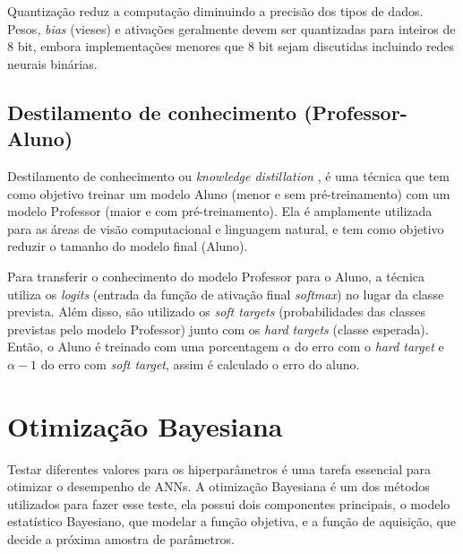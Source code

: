 Quantização reduz a computação diminuindo a precisão dos tipos de dados. Pesos, \textit{bias} (vieses) e ativações
geralmente devem ser quantizadas para inteiros de 8 bit, embora implementações menores que 8 bit sejam discutidas
incluindo redes neurais binárias. \cite{LIANG2021370}


\subsection{Destilamento de conhecimento (Professor-Aluno)}\label{conceitos_destilamento}

Destilamento de conhecimento ou \textit{knowledge distillation} \cite{hinton2015distilling}, é uma técnica que tem
como objetivo treinar um modelo Aluno (menor e sem pré-treinamento) com um modelo Professor
(maior e com pré-treinamento). Ela é amplamente utilizada para as áreas de visão computacional e linguagem natural,
e tem como objetivo reduzir o tamanho do modelo final (Aluno).

Para transferir o conhecimento do modelo Professor para o Aluno, a técnica utiliza os \textit{logits} (entrada da
função de ativação final \textit{softmax}) no lugar da classe prevista. Além disso, são utilizado os
\textit{soft targets} (probabilidades das classes previstas pelo modelo Professor) junto com os
\textit{hard targets} (classe esperada). Então, o Aluno é treinado com uma porcentagem $\alpha$ do erro com o
\textit{hard target} e $\alpha - 1$ do erro com \textit{soft target}, assim é calculado o erro do aluno.



\section{Otimização Bayesiana}\label{cap_conceitos_bayesiana}
Testar diferentes valores para os hiperparâmetros é uma tarefa essencial para otimizar o desempenho de ANNs.
A otimização Bayesiana é um dos métodos utilizados para fazer esse teste, ela possui dois componentes principais,
o modelo estatístico Bayesiano, que modelar a função objetiva, e a função de aquisição, que decide a próxima amostra
de parâmetros. \cite{frazier2018tutorial}

